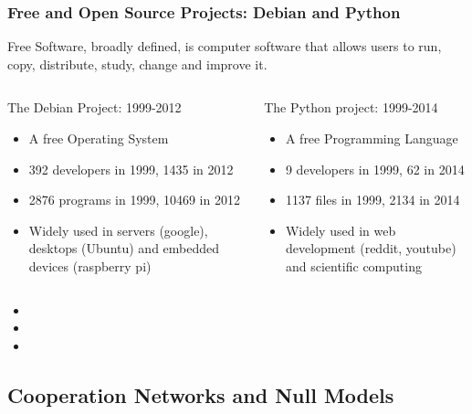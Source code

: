 \documentclass[ignorenonframetext,red,8pt,notes=show]{beamer}
\begin{document}
\begin{frame}
\frametitle{Free and Open Source Projects: Debian and Python}

Free Software, broadly defined, is computer software that allows users to run, copy, distribute, study, change and improve it.

\begin{columns}[c]
\begin{column}{0.5\textwidth}
\begin{block}{The Debian Project: 1999-2012}
\begin{itemize}
\item A free Operating System
\item 392 developers in 1999, 1435 in 2012 
\item 2876 programs in 1999, 10469 in 2012
\item Widely used in servers (google), desktops (Ubuntu) and embedded devices (raspberry pi)
\end{itemize}
\end{block}
\end{column}

\begin{column}{0.5\textwidth}
\begin{block}{The Python project: 1999-2014}
\begin{itemize}
\item A free Programming Language
\item 9 developers in 1999, 62 in 2014
\item 1137 files in 1999, 2134 in 2014 
\item Widely used in web development (reddit, youtube) and scientific computing
\end{itemize}
\end{block}
\end{column}
\end{columns}

\begin{block}{}
\begin{itemize}
\item 
\item 
\item 
\end{itemize}
\end{block}

\end{frame}

\subsection{Cooperation Networks and Null Models}
\end{document}
